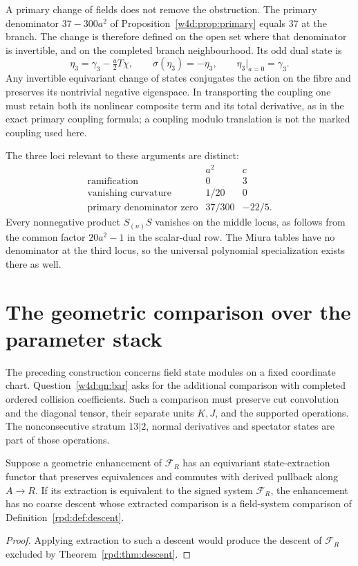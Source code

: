 A primary change of fields does not remove the obstruction. The
primary denominator $37-300a^2$ of Proposition~\ref{w4d:prop:primary}
equals $37$ at the branch. The change is therefore defined on the
open set where that denominator is invertible, and on the completed
branch neighbourhood. Its odd dual state is
\[
 \eta_3=\gamma_3-\tfrac a2T\chi,
 \qquad \sigma(\eta_3)=-\eta_3,
 \qquad \eta_3|_{a=0}=\gamma_3.
\]
Any invertible equivariant change of states conjugates the action on
the fibre and preserves its nontrivial negative eigenspace. In
transporting the coupling one must retain both its nonlinear
composite term and its total derivative, as in the exact primary
coupling formula; a coupling modulo translation is not the marked
coupling used here.

The three loci relevant to these arguments are distinct:
\[
 \begin{array}{c|c|c}
  &a^2&c\\ \hline
 \text{ramification}&0&3\\
 \text{vanishing curvature}&1/20&0\\
 \text{primary denominator zero}&37/300&-22/5.
 \end{array}
\]
Every nonnegative product $S_{(n)}S$ vanishes on the middle locus, as
follows from the common factor $20a^2-1$ in the scalar-dual row.
The Miura tables have no denominator at the third locus, so the
universal polynomial specialization exists there as well.

\section{The geometric comparison over the parameter stack}

The preceding construction concerns field state modules on a fixed
coordinate chart. Question~\ref{w4d:qn:bar} asks for the additional
comparison with completed ordered collision coefficients. Such a
comparison must preserve cut convolution and the diagonal tensor,
their separate units $K,J$, and the supported operations. The
nonconsecutive stratum $13|2$, normal derivatives and spectator states
are part of those operations.

\begin{corollary}\label{rpd:cor:geometric}
Suppose a geometric enhancement of $\mathcal F_R$ has an equivariant
state-extraction functor that preserves equivalences and commutes
with derived pullback along $A\to R$. If its extraction is equivalent
to the signed system $\mathcal F_R$, the enhancement has no coarse
descent whose extracted comparison is a field-system comparison of
Definition~\ref{rpd:def:descent}.
\end{corollary}
\begin{proof}
Applying extraction to such a descent would produce the descent of
$\mathcal F_R$ excluded by Theorem~\ref{rpd:thm:descent}.
\end{proof}

